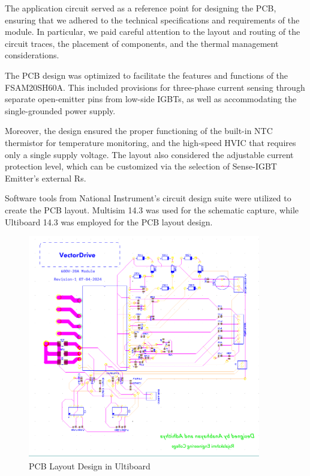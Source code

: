 The application circuit served as a reference point for designing the PCB, ensuring that we adhered to the technical specifications and requirements of the module. In particular, we paid careful attention to the layout and routing of the circuit traces, the placement of components, and the thermal management considerations. 

The PCB design was optimized to facilitate the features and functions of the FSAM20SH60A. This included provisions for three-phase current sensing through separate open-emitter pins from low-side IGBTs, as well as accommodating the single-grounded power supply. 

Moreover, the design ensured the proper functioning of the built-in NTC thermistor for temperature monitoring, and the high-speed HVIC that requires only a single supply voltage. The layout also considered the adjustable current protection level, which can be customized via the selection of Sense-IGBT Emitter's external Rs. 

Software tools from National Instrument's circuit design suite were utilized to create the PCB layout. Multisim 14.3 was used for the schematic capture, while Ultiboard 14.3 was employed for the PCB layout design.

\begin{figure}[H]
	\centering
	\includegraphics[width=4in]{sections/section4/images/PCBDesign/Ultiboard/Ultiboard.png}
	\caption{PCB Layout Design in Ultiboard}
\end{figure}


